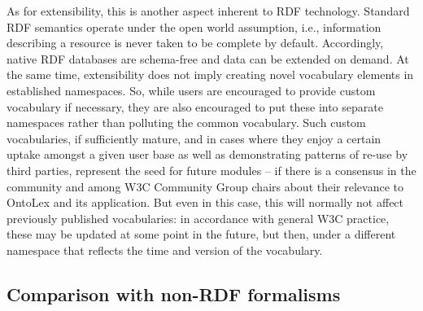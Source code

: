 \documentclass[output=paper,colorlinks,citecolor=brown]{langscibook}
\begin{document}
As for extensibility, this is another aspect inherent to RDF technology. Standard RDF  semantics operate under the open world assumption, i.e., information describing a resource is never taken to be complete by default. Accordingly, native RDF databases are schema-free and data can be extended on demand.
At the same time, extensibility does not imply creating novel vocabulary elements in established namespaces. So, while users are encouraged to provide custom vocabulary if necessary, they are also encouraged to put these into separate namespaces rather than polluting the common vocabulary. Such custom vocabularies, if sufficiently mature, and in cases where they enjoy a certain uptake amongst a given user base as well as demonstrating  patterns of re-use by third parties,  represent the seed for future modules -- if there is a consensus in the community and among W3C Community Group chairs about their relevance to OntoLex and its application. But even in this case, this will normally not affect previously published vocabularies: in accordance with general W3C practice, these may be updated at some point in the future, but then, under a different namespace that reflects the time and version of the vocabulary.

\subsection{Comparison with non-RDF formalisms} %
\label{ssec-relres}


\end{document}
